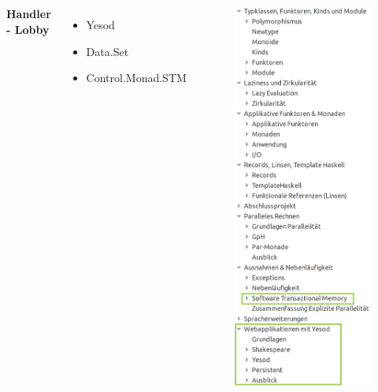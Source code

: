 \documentclass{beamer}
\begin{document}
\begin{frame}

\begin{columns}

{\Large \textbf{Handler - Lobby}}

\begin{itemize}
    \item Yesod
    \item Data.Set
    \item Control.Monad.STM
\end{itemize}


\begin{figure}
\includegraphics[height=0.9\paperheight]{cont/sslobby.png}
\end{figure}


\end{columns}
\end{frame}
\end{document}

